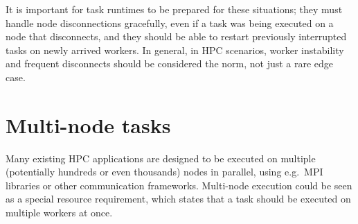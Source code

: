 It is important for task runtimes to be prepared for these situations; they must handle node
disconnections gracefully, even if a task was being executed on a node that disconnects, and they
should be able to restart previously interrupted tasks on newly arrived workers. In general, in HPC
scenarios, worker instability and frequent disconnects should be considered the norm, not just a
rare edge case.

\section{Multi-node tasks}
Many existing HPC applications are designed to be executed on multiple (potentially hundreds or
even thousands) nodes in parallel, using e.g.\ MPI libraries or other communication frameworks.
Multi-node execution could be seen as a special resource requirement, which states that a task
should be executed on multiple workers at once.

